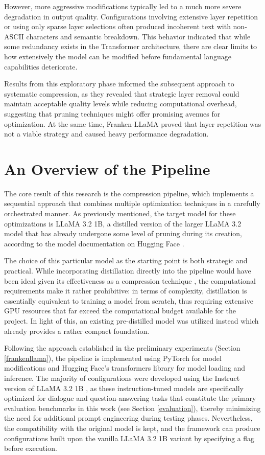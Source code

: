 However, more aggressive modifications typically led to a much more severe degradation in output quality. Configurations involving extensive layer repetition or using only sparse layer selections often produced incoherent text with non-ASCII characters and semantic breakdown. This behavior indicated that while some redundancy exists in the Transformer architecture, there are clear limits to how extensively the model can be modified before fundamental language capabilities deteriorate.

Results from this exploratory phase informed the subsequent approach to systematic compression, as they revealed that strategic layer removal could maintain acceptable quality levels while reducing computational overhead, suggesting that pruning techniques might offer promising avenues for optimization. At the same time, Franken-LLaMA proved that layer repetition was not a viable strategy and caused heavy performance degradation.

\section{An Overview of the Pipeline}

The core result of this research is the compression pipeline, which implements a sequential approach that combines multiple optimization techniques in a carefully orchestrated manner. As previously mentioned, the target model for these optimizations is LLaMA 3.2 1B, a distilled version of the larger LLaMA 3.2 model that has already undergone some level of pruning during its creation, according to the model documentation on Hugging Face \cite{llama3_1b}.

The choice of this particular model as the starting point is both strategic and practical. While incorporating distillation directly into the pipeline would have been ideal given its effectiveness as a compression technique \cite{homodistil}, the computational requirements make it rather prohibitive: in terms of complexity, distillation is essentially equivalent to training a model from scratch, thus requiring extensive GPU resources that far exceed the computational budget available for the project. In light of this, an existing pre-distilled model was utilized instead which already provides a rather compact foundation.

Following the approach established in the preliminary experiments (Section \ref{frankenllama}), the pipeline is implemented using PyTorch \cite{pytorch} for model modifications and Hugging Face's transformers library \cite{hf_transformers} for model loading and inference. The majority of configurations were developed using the Instruct version of LLaMA 3.2 1B \cite{llama3_1b_instruct}, as these instruction-tuned models are specifically optimized for dialogue and question-answering tasks that constitute the primary evaluation benchmarks in this work (see Section \ref{evaluation}), thereby minimizing the need for additional prompt engineering during testing phases. Nevertheless, the compatibility with the original model is kept, and the framework can produce configurations built upon the vanilla LLaMA 3.2 1B variant \cite{llama3_1b} by specifying a flag before execution.

